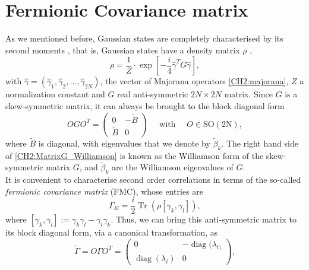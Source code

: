 \section{Fermionic Covariance matrix }
As we mentioned before, Gaussian states are completely characterised by its second moments \cite{westwanski_general_1973,molinari_notes_2017}, that is, Gaussian states have a density matrix $\rho$ \cite{cheong_many-body_2003},
\begin{equation}
\rho= \frac{1}{Z} \cdot \exp \left[-\frac{i}{4} \hat{\gamma}^{T} G \hat{\gamma}\right],
\label{CH2:rho_gaussiano_exp}
\end{equation}
with $\hat{\gamma} = (\hat{\gamma}_1,\hat{\gamma}_2,\ldots,\hat{\gamma}_{2N})$, the vector of Majorana operators \eqref{CH2:majorana}, $Z$ a normalization constant and $G$ real anti-symmetric $2N\times 2N$ matrix. Since $G$ is a skew-symmetric matrix, it can always be brought to the block diagonal form 
\begin{equation}
O G O^{T}=\left(\begin{array}{cc}
0 & -\tilde{B} \\
\tilde{B} & 0
\end{array}\right) \quad \text { with } \quad O \in \mathrm{SO}(2 \mathrm{N}),
\label{CH2:MatrixG_Williamson}
\end{equation}
where $\tilde{B}$ is diagonal, with eigenvalues that we denote by $\tilde{\beta}_k$. The right hand side of \eqref{CH2:MatrixG_Williamson} is known as the Williamson form of the skew-symmetric matrix $G$, and $\tilde{\beta}_k$ are the Williamson eigenvalues of $G$\cite{kraus_pairing_2009}.\\
\indent It is convenient to characterise second order correlations in terms of the so-called \textit{fermionic covariance matrix} (FMC), whose entries are
\begin{equation}
\Gamma_{k l}=\frac{i}{2} \operatorname{Tr}\left(\rho\left[\gamma_{k}, \gamma_{l}\right]\right),
\label{CH2:Cov_matrix_elements}
\end{equation}
where $\left[\gamma_{k}, \gamma_{l}\right] := \gamma_{k}\gamma_{l} - \gamma_{l}\gamma_{k}$. Thus, we can bring this anti-symmetric matrix to its block diagonal form, via a canonical transformation, as
\begin{equation}
\tilde{\Gamma} = O \Gamma O^{T}=\left(\begin{array}{cc}
0 & -\operatorname{diag}(\lambda_{i)} \\
\operatorname{diag}(\lambda_{i}) & 0
\end{array}\right),
\label{CH2:Williamson_Cov_fermionic_matrix}
\end{equation}
